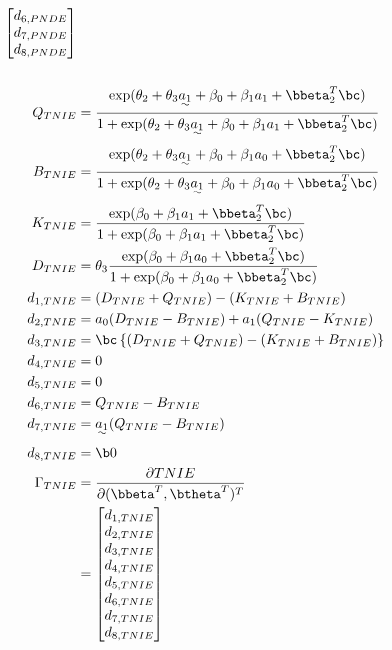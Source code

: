 \documentclass[dvipdfmx,10pt]{article}
\begin{document}
\begin{align*}
\begin{bmatrix}
      d_{6,PNDE}\\
      d_{7,PNDE}\\
      d_{8,PNDE}\\
    \end{bmatrix}\\
  \\
  Q_{TNIE} &= \frac
      {    \exp(\theta_{2} + \theta_{3}\uwave{a_{1}} + \beta_{0} + \beta_{1}a_{1} + \bbeta_{2}^{T}\bc)}
      {1 + \exp(\theta_{2} + \theta_{3}\uwave{a_{1}} + \beta_{0} + \beta_{1}a_{1} + \bbeta_{2}^{T}\bc)}\\
  B_{TNIE} &= \frac
      {    \exp(\theta_{2} + \theta_{3}\uwave{a_{1}} + \beta_{0} + \beta_{1}a_{0} + \bbeta_{2}^{T}\bc)}
      {1 + \exp(\theta_{2} + \theta_{3}\uwave{a_{1}} + \beta_{0} + \beta_{1}a_{0} + \bbeta_{2}^{T}\bc)}\\
  K_{TNIE} &= \frac
      {    \exp(\beta_{0} + \beta_{1}a_{1} + \bbeta_{2}^{T}\bc)}
      {1 + \exp(\beta_{0} + \beta_{1}a_{1} + \bbeta_{2}^{T}\bc)}\\
  D_{TNIE} &= \theta_{3} \frac
      {    \exp(\beta_{0} + \beta_{1}a_{0} + \bbeta_{2}^{T}\bc)}
      {1 + \exp(\beta_{0} + \beta_{1}a_{0} + \bbeta_{2}^{T}\bc)}\\
  d_{1,TNIE} &= (D_{TNIE} + Q_{TNIE}) - (K_{TNIE} + B_{TNIE})\\
  d_{2,TNIE} &= a_{0}(D_{TNIE} - B_{TNIE}) + a_{1}(Q_{TNIE} - K_{TNIE})\\
  d_{3,TNIE} &= \bc \left\{ (D_{TNIE} + Q_{TNIE}) - (K_{TNIE} + B_{TNIE}) \right\}\\
  d_{4,TNIE} &= 0\\
  d_{5,TNIE} &= 0\\
  d_{6,TNIE} &= Q_{TNIE} - B_{TNIE}\\
  d_{7,TNIE} &= \uwave{a_{1}} (Q_{TNIE} - B_{TNIE})\\
  d_{8,TNIE} &= \b0\\
  \Gamma_{TNIE}
  &= \frac{\partial TNIE}{\partial (\bbeta^{T},\btheta^{T})^{T}}\\
  &= \begin{bmatrix}
      d_{1,TNIE}\\
      d_{2,TNIE}\\
      d_{3,TNIE}\\
      d_{4,TNIE}\\
      d_{5,TNIE}\\
      d_{6,TNIE}\\
      d_{7,TNIE}\\
      d_{8,TNIE}\\

\end{bmatrix}
\end{align*}
\end{document}
